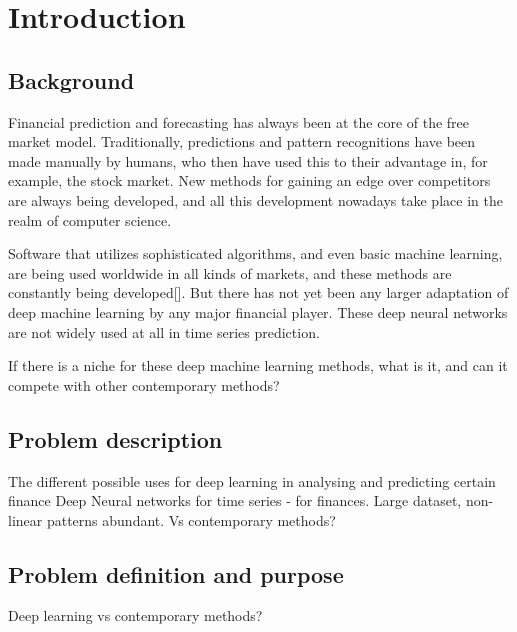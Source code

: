 \section{Introduction}

\subsection{Background}

Financial prediction and forecasting has always been at the core of the free market model. Traditionally, predictions and pattern recognitions have been made manually by humans, who then have used this to their advantage in, for example, the stock market. New methods for gaining an edge over competitors are always being developed, and all this development nowadays take place in the realm of computer science.

Software that utilizes sophisticated algorithms, and even basic machine learning, are being used worldwide in all kinds of markets, and these methods are constantly being developed[]. But there has not yet been any larger adaptation of deep machine learning by any major financial player. These deep neural networks are not widely used at all in time series prediction.

If there is a niche for these deep machine learning methods, what is it, and can it compete with other contemporary methods?


\subsection{Problem description}


The different possible uses for deep learning in analysing and predicting certain finance
Deep Neural networks for time series - for finances.
Large dataset, non-linear patterns abundant.
Vs contemporary methods?


\subsection{Problem definition and purpose}

Deep learning vs contemporary methods?

